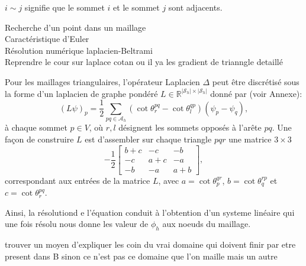 \(i \sim j\) signifie que le sommet \(i\) et le sommet \(j\) sont adjacents.

\newpage
Recherche d'un point dans un maillage\\
Caractéristique d'Euler\\
Résolution numérique laplacien-Beltrami\\
Reprendre le cour sur laplace cotan ou il ya les gradient de trianngle detaillé\\
\[\]

Pour les maillages triangulaires, l'opérateur Laplacien $\Delta$ peut être discrétisé sous la forme d'un laplacien de graphe pondéré $L\in\mathbb{R}^{|\mathcal{S}_h|\times|\mathcal{S}_h|}$ donné par \cite{sharp2019vector} (voir Annexe):
$$
(L\psi)_p=\frac{1}{2}\sum_{pq\in\mathcal{A}_h}(\cot\theta_r^{pq}-\cot\theta_l^{qp})(\psi_p-\psi_q),
$$
à chaque sommet $p\in V$, où $r, l$ désignent les sommets opposés à l'arête $pq$. Une façon de construire $L$ est d'assembler sur chaque triangle $pqr$ une matrice $3\times 3$
$$
-\frac{1}{2}
\begin{bmatrix}
b+c & -c & -b\\
-c & a+c & -a\\
-b & -a & a+b
\end{bmatrix},
$$
correspondant aux entrées de la matrice $L$, avec $a=\cot\theta_p^{qr}$, $b=\cot\theta_q^{rp}$ et $c=\cot\theta_r^{pq}$.

Ainsi, la résolutiond e l'équation conduit à l'obtention d'un systeme linéaire qui une fois résolu nous donne les valeur de $\phi_h$ aux noeuds du maillage.

\[\]
trouver un moyen d'expliquer les coin du vrai domaine qui doivent finir par etre present dans B sinon ce n'est pas ce domaine que l'on maille mais un autre
